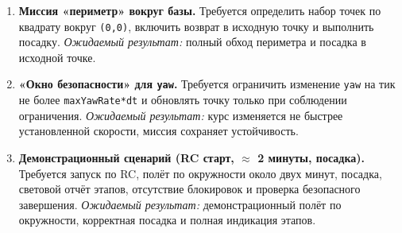 \begin{enumerate}
    \textit{Ожидаемый результат:} получены интервалы времени, оценено постоянство периода между достижениями точек.
  \item \textbf{Миссия «периметр» вокруг базы.}
    Требуется определить набор точек по квадрату вокруг \texttt{(0,0)}, включить возврат в исходную точку и выполнить посадку.
    \textit{Ожидаемый результат:} полный обход периметра и посадка в исходной точке.
  \item \textbf{«Окно безопасности» для \texttt{yaw}.}
    Требуется ограничить изменение \texttt{yaw} на тик не более \texttt{maxYawRate*dt} и обновлять точку только при соблюдении ограничения.
    \textit{Ожидаемый результат:} курс изменяется не быстрее установленной скорости, миссия сохраняет устойчивость.
  \item \textbf{Демонстрационный сценарий (RC старт, \(\approx\) 2 минуты, посадка).}
    Требуется запуск по RC, полёт по окружности около двух минут, посадка, световой отчёт этапов, отсутствие блокировок и проверка безопасного завершения.
    \textit{Ожидаемый результат:} демонстрационный полёт по окружности, корректная посадка и полная индикация этапов.
\end{enumerate}

